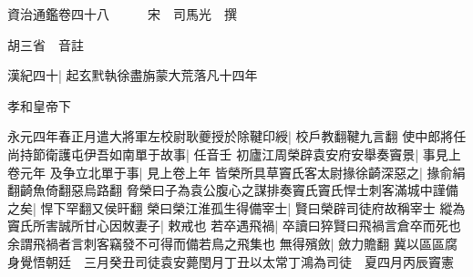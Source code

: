 






























































資治通鑑卷四十八　　　宋　司馬光　撰

胡三省　音註

漢紀四十|{
	起玄黓執徐盡旃蒙大荒落凡十四年}


孝和皇帝下

永元四年春正月遣大將軍左校尉耿夔授於除鞬印綬|{
	校戶教翻鞬九言翻}
使中郎將任尚持節衛護屯伊吾如南單于故事|{
	任音壬}
初廬江周榮辟袁安府安舉奏竇景|{
	事見上卷元年}
及争立北單于事|{
	見上卷上年}
皆榮所具草竇氏客太尉掾徐齮深惡之|{
	掾俞絹翻齮魚倚翻惡烏路翻}
脅榮曰子為袁公腹心之謀排奏竇氏竇氏悍士刺客滿城中謹備之矣|{
	悍下罕翻又侯旰翻}
榮曰榮江淮孤生得備宰士|{
	賢曰榮辟司徒府故稱宰士}
縱為竇氏所害誠所甘心因敇妻子|{
	敕戒也}
若卒遇飛禍|{
	卒讀曰猝賢曰飛禍言倉卒而死也余謂飛禍者言刺客竊發不可得而備若鳥之飛集也}
無得殯斂|{
	斂力贍翻}
冀以區區腐身覺悟朝廷　三月癸丑司徒袁安薨閏月丁丑以太常丁鴻為司徒　夏四月丙辰竇憲


